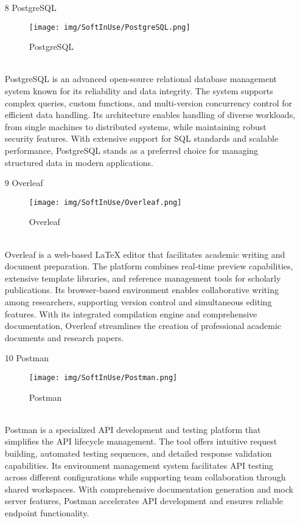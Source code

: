 \documentclass[conference]{IEEEtran}
\begin{document}
\begin{enumerate}
\begin{itemize}
\begin{itemize}
\begin{enumerate}
\item[8] PostgreSQL
\begin{figure}[h]
\centering
\texttt{[image: img/SoftInUse/PostgreSQL.png]}
\caption{PostgreSQL} 
\end{figure}\\
PostgreSQL is an advanced open-source relational database management system known for its reliability and data integrity. The system supports complex queries, custom functions, and multi-version concurrency control for efficient data handling. Its architecture enables handling of diverse workloads, from single machines to distributed systems, while maintaining robust security features. With extensive support for SQL standards and scalable performance, PostgreSQL stands as a preferred choice for managing structured data in modern applications.\\

\item[9] Overleaf
\begin{figure}[h]
\centering
\texttt{[image: img/SoftInUse/Overleaf.png]}
\caption{Overleaf} 
\end{figure}\\
Overleaf is a web-based LaTeX editor that facilitates academic writing and document preparation. The platform combines real-time preview capabilities, extensive template libraries, and reference management tools for scholarly publications. Its browser-based environment enables collaborative writing among researchers, supporting version control and simultaneous editing features. With its integrated compilation engine and comprehensive documentation, Overleaf streamlines the creation of professional academic documents and research papers.\\

\item[10] Postman
\begin{figure}[h]
\centering
\texttt{[image: img/SoftInUse/Postman.png]}
\caption{Postman} 
\end{figure}\\
Postman is a specialized API development and testing platform that simplifies the API lifecycle management. The tool offers intuitive request building, automated testing sequences, and detailed response validation capabilities. Its environment management system facilitates API testing across different configurations while supporting team collaboration through shared workspaces. With comprehensive documentation generation and mock server features, Postman accelerates API development and ensures reliable endpoint functionality.\\


\end{enumerate}
\end{itemize}
\end{itemize}
\end{enumerate}
\end{document}
